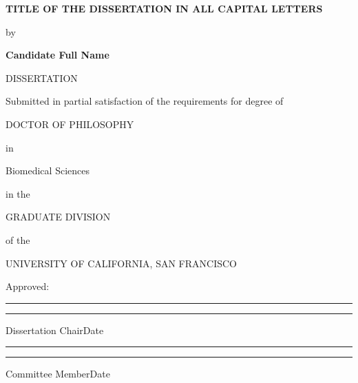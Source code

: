\documentclass[12pt,oneside]{report}
\begin{document}
\begin{center}
  \vspace*{0.5in}
  {\large\textbf{TITLE OF THE DISSERTATION IN ALL CAPITAL LETTERS}}\par
  \vspace{0.4in}
  by\par
  \vspace{0.2in}
  {\textbf{Candidate Full Name}}\par
  \vspace{0.6in}
  DISSERTATION\par
  \vspace{0.2in}
  Submitted in partial satisfaction of the requirements for degree of\par
  \vspace{0.2in}
  DOCTOR OF PHILOSOPHY\par
  \vspace{0.2in}
  in\par
  \vspace{0.2in}
  Biomedical Sciences\par
  \vspace{0.2in}
  in the\par
  \vspace{0.2in}
  GRADUATE DIVISION\par
  \vspace{0.2in}
  of the\par
  \vspace{0.2in}
  UNIVERSITY OF CALIFORNIA, SAN FRANCISCO\par
  \vspace{0.8in}
  Approved:\par
  \vspace{0.3in}
  \rule{3.5in}{0.5pt}\hspace{0.5in}\rule{1.5in}{0.5pt}\par
  Dissertation Chair\hspace{2.2in}Date\par
  \vspace{0.3in}
  \rule{3.5in}{0.5pt}\hspace{0.5in}\rule{1.5in}{0.5pt}\par
  Committee Member\hspace{2.0in}Date
\end{center}
\end{document}
